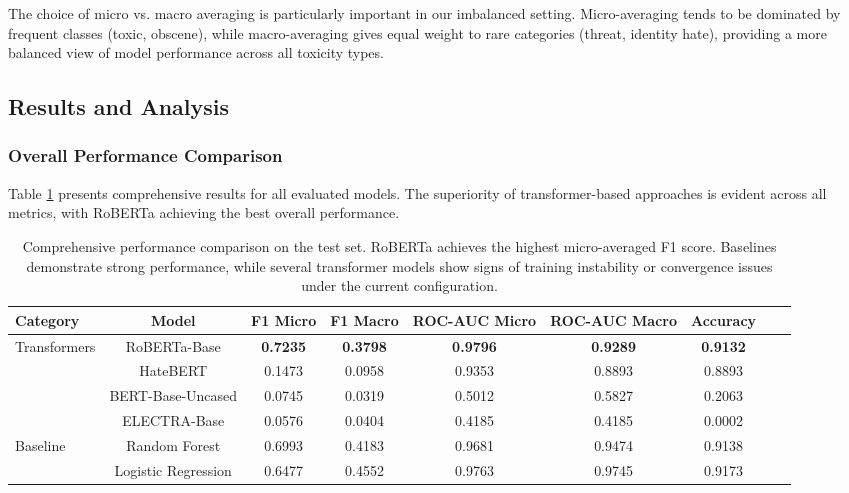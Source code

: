 \documentclass[11pt]{article}
\begin{document}
The choice of micro vs. macro averaging is particularly important in our imbalanced setting. Micro-averaging tends to be dominated by frequent classes (toxic, obscene), while macro-averaging gives equal weight to rare categories (threat, identity hate), providing a more balanced view of model performance across all toxicity types.

\subsection{Results and Analysis}

\subsubsection{Overall Performance Comparison}

Table \ref{tab:results_detailed} presents comprehensive results for all evaluated models. The superiority of transformer-based approaches is evident across all metrics, with RoBERTa achieving the best overall performance.

\begin{table}[ht]
\centering
\small
\begin{tabular}{lcccccccc}
\toprule
\textbf{Category} & \textbf{Model} & \textbf{F1 Micro} & \textbf{F1 Macro} & \textbf{ROC-AUC Micro} & \textbf{ROC-AUC Macro} & \textbf{Accuracy} \\
\midrule
Transformers & RoBERTa-Base & \textbf{0.7235} & \textbf{0.3798} & \textbf{0.9796} & \textbf{0.9289} & \textbf{0.9132} \\
 & HateBERT & 0.1473 & 0.0958 & 0.9353 & 0.8893 & 0.8893 \\
 & BERT-Base-Uncased & 0.0745 & 0.0319 & 0.5012 & 0.5827 & 0.2063 \\
 & ELECTRA-Base & 0.0576 & 0.0404 & 0.4185 & 0.4185 & 0.0002 \\
\midrule
Baseline & Random Forest & 0.6993 & 0.4183 & 0.9681 & 0.9474 & 0.9138 \\
 & Logistic Regression & 0.6477 & 0.4552 & 0.9763 & 0.9745 & 0.9173 \\
\bottomrule
\end{tabular}
\caption{Comprehensive performance comparison on the test set. RoBERTa achieves the highest micro-averaged F1 score. Baselines demonstrate strong performance, while several transformer models show signs of training instability or convergence issues under the current configuration.}
\label{tab:results_detailed}
\end{table}
\end{document}
